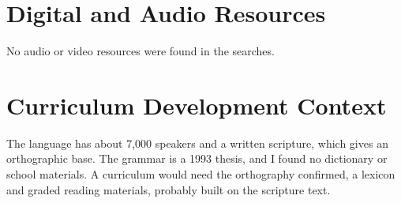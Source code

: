 \documentclass[12pt]{article}
\begin{document}
\section{Digital and Audio Resources}
No audio or video resources were found in the searches.

\section{Curriculum Development Context}
The language has about 7,000 speakers and a written scripture, which gives an orthographic base. The grammar is a 1993 thesis, and I found no dictionary or school materials. A curriculum would need the orthography confirmed, a lexicon and graded reading materials, probably built on the scripture text.
\end{document}
